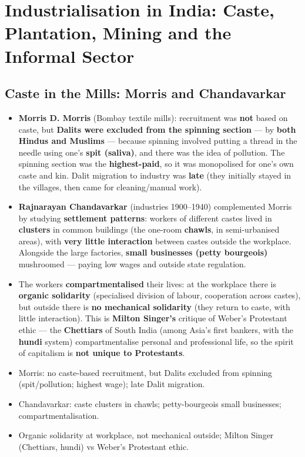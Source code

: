 \chapter{Industrialisation in India: Caste, Plantation, Mining and the Informal Sector}

\section{Caste in the Mills: Morris and Chandavarkar}

\begin{KeyConcept}
\begin{itemize}
\item \textbf{Morris D. Morris} (Bombay textile mills): recruitment was \textbf{not} based on caste, but \textbf{Dalits were excluded from the spinning section} --- by \textbf{both Hindus and Muslims} --- because spinning involved putting a thread in the needle using one's \textbf{spit (saliva)}, and there was the idea of pollution. The spinning section was the \textbf{highest-paid}, so it was monopolised for one's own caste and kin. Dalit migration to industry was \textbf{late} (they initially stayed in the villages, then came for cleaning/manual work).
\item \textbf{Rajnarayan Chandavarkar} (industries 1900--1940) complemented Morris by studying \textbf{settlement patterns}: workers of different castes lived in \textbf{clusters} in common buildings (the one-room \textbf{chawls}, in semi-urbanised areas), with \textbf{very little interaction} between castes outside the workplace. Alongside the large factories, \textbf{small businesses (petty bourgeois)} mushroomed --- paying low wages and outside state regulation.
\item The workers \textbf{compartmentalised} their lives: at the workplace there is \textbf{organic solidarity} (specialised division of labour, cooperation across castes), but outside there is \textbf{no mechanical solidarity} (they return to caste, with little interaction). This is \textbf{Milton Singer's} critique of Weber's Protestant ethic --- the \textbf{Chettiars} of South India (among Asia's first bankers, with the \textbf{hundi} system) compartmentalise personal and professional life, so the spirit of capitalism is \textbf{not unique to Protestants}.
\end{itemize}
\end{KeyConcept}

\begin{QuickRevision}
\begin{itemize}
\item Morris: no caste-based recruitment, but Dalits excluded from spinning (spit/pollution; highest wage); late Dalit migration.
\item Chandavarkar: caste clusters in chawls; petty-bourgeois small businesses; compartmentalisation.
\item Organic solidarity at workplace, not mechanical outside; Milton Singer (Chettiars, hundi) vs Weber's Protestant ethic.
\end{itemize}
\end{QuickRevision}


